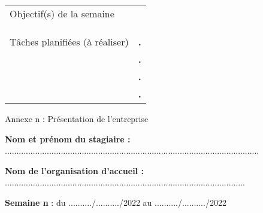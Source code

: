 \documentclass[a4paper,11pt]{article}
\makeatletter
\newcommand{\mktitle}{\@maketitle}
\makeatother
\begin{document}
\begin{center}
\begin{tabular}{|C{6cm}|p{10.3cm}|}
	\hline
	\\
	\hline
	Objectif(s) de la semaine &\\&\\&\\&\\
	\hline
	Tâches planifiées (à réaliser) & \hspace{.2cm}\huge\textbf{.}\\&\hspace{.2cm}\huge\textbf{.}\\&\hspace{.2cm}\huge\textbf{.}\\& \hspace{.2cm}\huge\textbf{.}\\
	\hline
\end{tabular}
\end{center}\newpage

\begin{center}\LARGE Annexe n : Présentation de l'entreprise\end{center}
\newpage

\mktitle\vspace{-.2cm}

\noindent\textbf{Nom et prénom du stagiaire :} .............................................................................................................\vspace{.4cm}

\noindent\textbf{Nom de l'organisation d'accueil :} .......................................................................................................\vspace{.4cm}

\noindent\textbf{Semaine n} : du ........../........../2022 au ........../........../2022\vspace{-.2cm}
\end{document}
